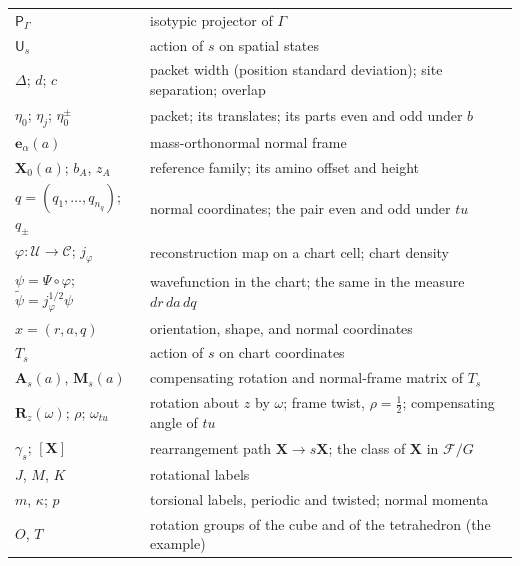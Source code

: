 \documentclass[11pt]{article}
\newcommand{\conf}{\mathcal{C}}
\newcommand{\X}{\mathbf{X}}
\newcommand{\Rmat}{\mathbf{R}}
\newcommand{\Uop}{\mathsf{U}}
\begin{document}
{\begin{tabular}{ll}
$\mathsf P_\Gamma$ & isotypic projector of $\Gamma$\\
$\Uop_s$ & action of $s$ on spatial states\\
$\Delta$; $d$; $c$ & packet width (position standard deviation); site separation; overlap\\
$\eta_0$; $\eta_j$; $\eta_0^\pm$ & packet; its translates; its parts even and odd under $b$\\[1ex]
$\mathbf e_\alpha(a)$ & mass-orthonormal normal frame\\
$\X_0(a)$; $b_A$, $z_A$ & reference family; its amino offset and height\\
$q=(q_1,\ldots,q_{n_q})$; $q_\pm$ & normal coordinates; the pair even and odd under $tu$\\
$\varphi:\mathcal U\to\conf$; $j_\varphi$ & reconstruction map on a chart cell; chart density\\
$\psi=\Psi\circ\varphi$; $\widetilde\psi=j_\varphi^{1/2}\psi$ & wavefunction in the chart; the same in the measure $dr\,da\,dq$\\
$x=(r,a,q)$ & orientation, shape, and normal coordinates\\
$T_s$ & action of $s$ on chart coordinates\\
$\mathbf A_s(a)$, $\mathbf M_s(a)$ & compensating rotation and normal-frame matrix of $T_s$\\
$\Rmat_z(\omega)$; $\rho$; $\omega_{tu}$ & rotation about $z$ by $\omega$; frame twist, $\rho=\frac12$; compensating angle of $tu$\\
$\gamma_s$; $[\X]$ & rearrangement path $\X\to s\X$; the class of $\X$ in $\mathcal F/G$\\
$J$, $M$, $K$ & rotational labels\\
$m$, $\kappa$; $p$ & torsional labels, periodic and twisted; normal momenta\\[1ex]
$O$, $T$ & rotation groups of the cube and of the tetrahedron (the example)\\
\hline
\end{tabular}}



\end{document}
